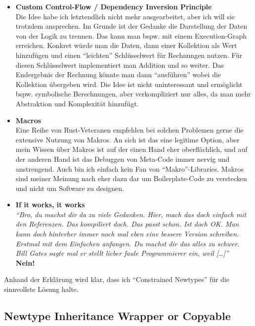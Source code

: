 \documentclass[12pt]{article}
\begin{document}
\begin{itemize}
\begin{lstlisting}[language=Rust, numbers=left]
	fn add(self, rhs: Self) -> Group<T> {
		Group(self.0.add(rhs.0))
	}
}

impl<T: GenGroup> Add<&Group<T>> for Group<T> {
	type Output = Group<T>;
	
	fn add(self, rhs: &Self) -> Self {
		Group(self.0.add_ref(&rhs.0))
	}
}

%*$\dots$*)
\end{lstlisting}
\item \textbf{Custom Control-Flow / Dependency Inversion Principle}\\
Die Idee habe ich letztendlich nicht mehr ausgearbeitet, aber ich will sie trotzdem ansprechen. Im Grunde ist der Gedanke die Darstellung der Daten von der Logik zu trennen. Das kann man bspw. mit einem Execution-Graph erreichen. Konkret würde man die Daten, dann einer Kollektion als Wert hinzufügen und einen ``leichten'' Schlüsselwert für Rechnungen nutzen. Für diesen Schlüsselwert implementiert man Addition und so weiter. Das Endergebnis der Rechnung könnte man dann ``ausführen'' wobei die Kollektion übergeben wird. Die Idee ist nicht uninteressant und ermöglicht bspw. symbolische Berechnungen, aber verkompliziert nur alles, da man mehr Abstraktion und Komplexität hinzufügt.
\item \textbf{Macros}\\
Eine Reihe von Rust-Veteranen empfehlen bei solchen Problemen gerne die extensive Nutzung von Makros. An sich ist das eine legitime Option, aber mein Wissen über Makros ist auf der einen Hand eher oberflächlich, und auf der anderen Hand ist das Debuggen von Meta-Code immer nervig und anstrengend. Auch bin ich einfach kein Fan von ``Makro''-Libraries. Makros sind meiner Meinung nach eher dazu dar um Boilerplate-Code zu verstecken und nicht um Software zu designen.
\item \textbf{If it works, it works}\\
\textit{``Bro, du machst dir da zu viele Gedanken. Hier, mach das doch einfach mit den Referenzen. Das kompiliert doch. Das passt schon. Ist doch OK. Man kann doch hinterher immer noch mal eben eine bessere Version schreiben. Erstmal mit dem Einfachen anfangen. Du machst dir das alles zu schwer. Bill Gates sagte mal er stellt lieber faule Programmierer ein, weil [\dots]''}\\
\textbf{Nein!}
\end{itemize}
Anhand der Erklärung wird klar, dass ich ``Constrained Newtypes'' für die sinnvollste Lösung halte.

\subsection{Newtype Inheritance Wrapper or Copyable}
\end{document}
